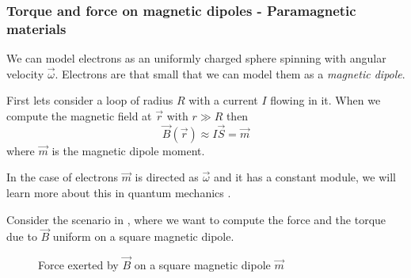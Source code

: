 \documentclass[12pt]{extarticle}
\begin{document}
\subsubsection{Torque and force on magnetic dipoles - Paramagnetic materials}

We can model electrons as an uniformly charged sphere spinning with angular velocity $\vec \omega$.
Electrons are that small that we can model them as a \emph{magnetic dipole}.

First lets consider a loop of radius $R$ with a current $I$ flowing in it.
When we compute the magnetic field at $\vec r$ with $r \gg R$ then
\begin{equation}
    \vec B(\vec r) \approx I \vec S = \vec m
\end{equation}
where $\vec m$ is the magnetic dipole moment.

In the case of electrons $\vec m$ is directed as $\vec \omega$ and it has a constant module,
we will learn more about this in quantum mechanics .

Consider the scenario in , where we want to compute the force and the torque due to $\vec B$ uniform on
a square magnetic dipole.
\begin{figure}[H]
    \centering
    
    \caption{Force exerted by $\vec B$ on a square magnetic dipole $\vec m$}
    \label{fig:mag-dipole}
\end{figure}
\end{document}
